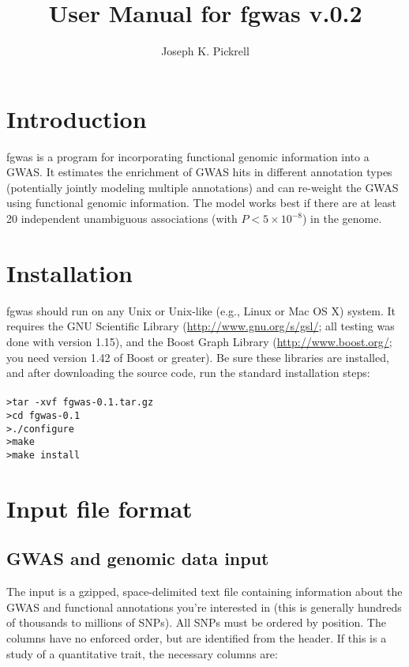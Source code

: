 \documentclass[11pt,titlepage]{article}
\begin{document}
\title{User Manual for fgwas v.0.2}
 \author{Joseph K. Pickrell}
 \maketitle

\tableofcontents
\clearpage
\section{Introduction}
fgwas is a program for incorporating functional genomic information into a GWAS. It estimates the enrichment of GWAS hits in different annotation types (potentially jointly modeling multiple annotations) and can re-weight the GWAS using functional genomic information. The model works best if there are at least 20 independent unambiguous associations (with $P < 5\times10^{-8}$) in the genome. 

\section{Installation}
fgwas should run on any Unix or Unix-like (e.g., Linux or Mac OS X) system. It requires the GNU Scientific Library (\url{http://www.gnu.org/s/gsl/}; all testing was done with version 1.15), and the Boost Graph Library (\url{http://www.boost.org/}; you need version 1.42 of Boost or greater). Be sure these libraries are installed, and after downloading the source code, run the standard installation steps: \\
\\
\noindent \texttt{>tar -xvf fgwas-0.1.tar.gz}\\
\noindent \texttt{>cd fgwas-0.1}\\
\noindent \texttt{>./configure}\\
\noindent \texttt{>make}\\
\noindent \texttt{>make install}\\
\section{Input file format}

\subsection{GWAS and genomic data input}
The input is a gzipped, space-delimited text file containing information about the GWAS and functional annotations you're interested in (this is generally hundreds of thousands to millions of SNPs). All SNPs must be ordered by position. The columns have no enforced order, but are identified from the header. If this is a study of a quantitative trait, the necessary columns are:
\end{document}
